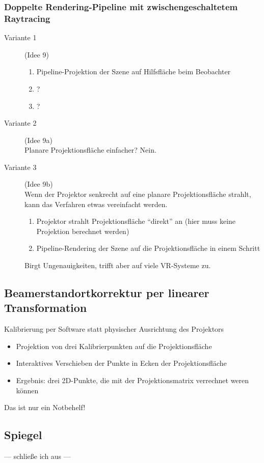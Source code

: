 \documentclass[a4paper, 12pt]{article}
\begin{document}
\subsubsection*{Doppelte Rendering-Pipeline mit zwischengeschaltetem Raytracing}
\begin{description}
  \item[Variante 1] (Idee 9)
    \begin{enumerate}
      \item Pipeline-Projektion der Szene auf Hilfsfläche beim Beobachter
      \item ?
      \item ?
    \end{enumerate}
  \item[Variante 2] (Idee 9a)\\
    Planare Projektionsfläche einfacher? Nein.
  \item[Variante 3] (Idee 9b)\\
    Wenn der Projektor senkrecht auf eine planare Projektionsfläche strahlt, kann das Verfahren etwas vereinfacht werden.
    \begin{enumerate}
      \item Projektor strahlt Projektionsfläche ``direkt'' an (hier muss keine Projektion berechnet werden)
      \item Pipeline-Rendering der Szene auf die Projektionsfläche in einem Schritt
    \end{enumerate}
    Birgt Ungenauigkeiten, trifft aber auf viele VR-Systeme zu.
\end{description}


\subsection{Beamerstandortkorrektur per linearer Transformation}
Kalibrierung per Software statt physischer Ausrichtung des Projektors
\begin{itemize}
  \item Projektion von drei Kalibrierpunkten auf die Projektionsfläche
  \item Interaktives Verschieben der Punkte in Ecken der Projektionsfläche
  \item Ergebnis: drei 2D-Punkte, die mit der Projektionsmatrix verrechnet weren können
\end{itemize}
Das ist nur ein Notbehelf!


\subsection{Spiegel}
--- schließe ich aus ---
\end{document}
